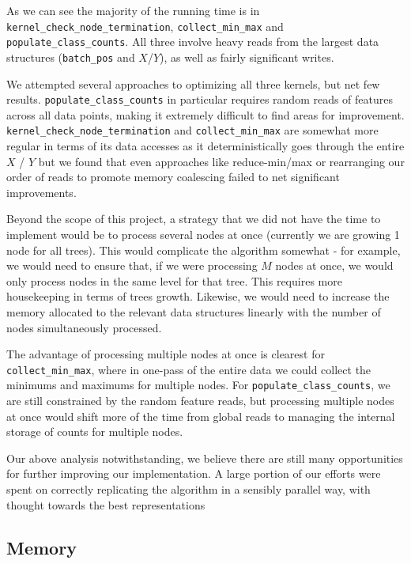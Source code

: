 \documentclass[10pt,conference]{IEEEtran}
\begin{document}
    As we can see the majority of the running time is in \texttt{kernel\_check\_node\_termination}, \texttt{collect\_min\_max} and \texttt{populate\_class\_counts}. All three involve heavy reads from the largest data structures (\texttt{batch\_pos} and $X$/$Y$), as well as fairly significant writes. 
    
    We attempted several approaches to optimizing all three kernels, but net few results. \texttt{populate\_class\_counts} in particular requires random reads of features across all data points, making it extremely difficult to find areas for improvement. \texttt{kernel\_check\_node\_termination} and \texttt{collect\_min\_max} are somewhat more regular in terms of its data accesses as it deterministically goes through the entire $X$ / $Y$ but we found that even approaches like reduce-min/max or rearranging our order of reads to promote memory coalescing failed to net significant improvements.
    
    Beyond the scope of this project, a strategy that we did not have the time to implement would be to process several nodes at once (currently we are growing 1 node for all trees). This would complicate the algorithm somewhat - for example, we would need to ensure that, if we were processing $M$ nodes at once, we would only process nodes in the same level for that tree. This requires more housekeeping in terms of trees growth. Likewise, we would need to increase the memory allocated to the relevant data structures linearly with the number of nodes simultaneously processed.
    
    The advantage of processing multiple nodes at once is clearest for \texttt{collect\_min\_max}, where in one-pass of the entire data we could collect the minimums and maximums for multiple nodes. For \texttt{populate\_class\_counts}, we are still constrained by the random feature reads, but processing multiple nodes at once would shift more of the time from global reads to managing the internal storage of counts for multiple nodes.
    
    Our above analysis notwithstanding, we believe there are still many opportunities for further improving our implementation. A large portion of our efforts were spent on correctly replicating the algorithm in a sensibly parallel way, with thought towards the best representations 
  
  \subsection{Memory}
    
\end{document}
